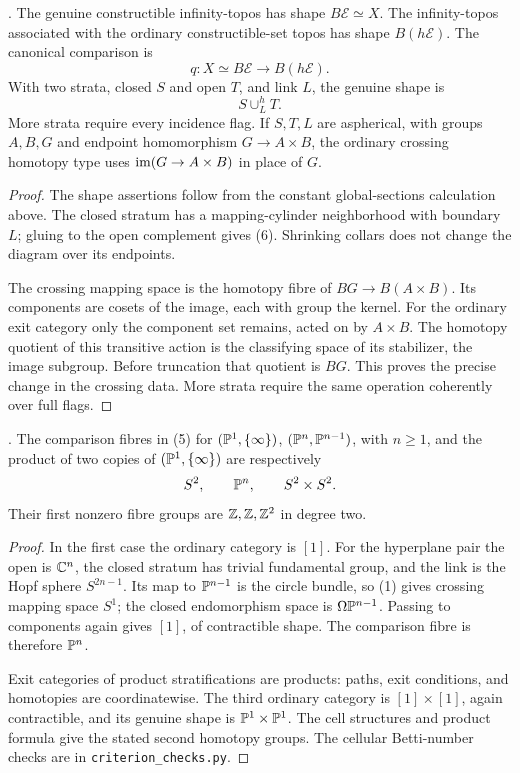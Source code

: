\begin{theorem}\label{P1d1}
.
The genuine constructible infinity-topos has shape
$B\mathcal E\simeq X$. The infinity-topos associated
with the ordinary constructible-set topos has shape
$B(h\mathcal E)$. The canonical comparison is
\[
            q:X\simeq B\mathcal E\longrightarrow B(h\mathcal E). \tag{5}
\]
With two strata, closed $S$ and open $T$, and link $L$,
the genuine shape is
\[
                              S\cup_L^hT. \tag{6}
\]
More strata require every incidence flag.
If $S,T,L$ are aspherical, with groups $A,B,G$
and endpoint homomorphism $G\to A\times B$,
the ordinary crossing homotopy type uses
$\operatorname{im}(G\to A\times B)$ in place of $G$.
\end{theorem}
\begin{proof}
The shape assertions follow from the constant
global-sections calculation above. The closed
stratum has a mapping-cylinder neighborhood with
boundary $L$; gluing to the open complement
gives (6). Shrinking collars does not change
the diagram over its endpoints.

The crossing mapping space is the homotopy
fibre of $BG\to B(A\times B)$. Its components
are cosets of the image, each with group
the kernel. For the ordinary exit category
only the component set remains, acted on
by $A\times B$. The homotopy quotient of
this transitive action is the classifying
space of its stabilizer, the image subgroup.
Before truncation that quotient is $BG$.
This proves the precise change in the
crossing data. More strata require the
same operation coherently over full flags.
\end{proof}

\begin{proposition}\label{P1d2}
.
The comparison fibres in (5) for
$(\mathbb P^1,\{\infty\})$, $(\mathbb P^n,\mathbb P^{n-1})$,
with $n\ge1$, and the product of two copies of
$(\mathbb P^1,\{\infty\})$ are respectively
\[
                    S^2,\qquad\mathbb P^n,\qquad S^2\times S^2 .
\]
Their first nonzero fibre groups are $\mathbb Z,\mathbb Z,\mathbb Z^2$
in degree two.
\end{proposition}
\begin{proof}
In the first case the ordinary category is $[1]$.
For the hyperplane pair the open is $\mathbb C^n$,
the closed stratum has trivial fundamental group,
and the link is the Hopf sphere $S^{2n-1}$.
Its map to $\mathbb P^{n-1}$ is the circle bundle,
so (1) gives crossing mapping space $S^1$;
the closed endomorphism space is
$\Omega\mathbb P^{n-1}$. Passing to components
again gives $[1]$, of contractible shape.
The comparison fibre is therefore $\mathbb P^n$.

Exit categories of product stratifications
are products: paths, exit conditions, and
homotopies are coordinatewise. The third
ordinary category is $[1]\times[1]$,
again contractible, and its genuine shape
is $\mathbb P^1\times\mathbb P^1$.
The cell structures and product formula
give the stated second homotopy groups.
The cellular Betti-number checks are in
\texttt{criterion\_checks.py}.
\end{proof}

